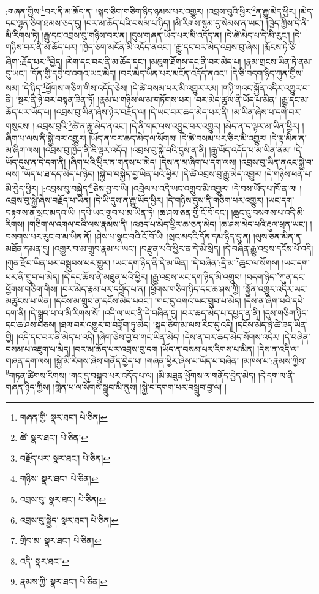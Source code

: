 :གཞན་གྱིས་\footnote{གཞན་གྱི་  སྣར་ཐང་།  པེ་ཅིན། }བར་ནི་མ་ཆོད་ན། །སྐད་ཅིག་གཅིག་ཉིད་ཉམས་པར་འགྱུར། །འབྲས་བུའི་ཕྱིར་\footnote{ཚེ་  སྣར་ཐང་།  པེ་ཅིན། }ན་རྒྱུ་མེད་ཕྱིར། །མེད་དང་ལྷན་ཅིག་ཐམས་ཅད་དུ། །བར་མ་ཆོད་པའི་བསམ་པ་ཉིད། །མི་རིགས་སྙམ་དུ་སེམས་ན་ཡང་། །ཁྱེད་ཀྱིས་དེ་ནི་མི་རིགས་ཏེ། །རྒྱུ་དང་འབྲས་བུ་གཉིས་བར་ན། །དུས་གཞན་ཡོད་པར་མི་འདོད་ན། །དེ་ཚེ་མེད་པ་དེ་མི་རུང་། །དེ་གཉིས་བར་ནི་མ་ཆོད་པར། །ཁྱེད་ཅག་མངོན་མི་འདོད་ནའང་། །རྒྱུ་དང་བར་མེད་འབྲས་བུ་ཞེས། །རྨོངས་ཏེ་ཅི་ཞིག་:རྗོད་པར་\footnote{བརྗོད་པར་  སྣར་ཐང་།  པེ་ཅིན། }བྱེད། །རེག་དང་བར་ནི་མ་ཆོད་དང་། །མཇུག་ཐོགས་དང་ནི་བར་མེད་པ། །རྣམ་གྲངས་ཡིན་ཏེ་ནམ་དུ་ཡང་། །དོན་གྱི་དབྱེ་བ་འགའ་ཡང་མེད། །བར་མེད་ཡིན་པར་མངོན་འདོད་ནའང་། །དེ་ཅི་བདག་ཉིད་ཀུན་གྱིས་སམ། །དེ་ཉིད་\footnote{གཉིས་  སྣར་ཐང་།  པེ་ཅིན། }ཕྱོགས་གཅིག་གིས་འདོད་ཅེས། །དེ་ཚེ་བསམ་པར་མི་འགྱུར་རམ། །གཉི་གའང་སྐྱོན་འདིར་འགྱུར་བ་ནི། །སྔར་ནི་ཉེ་བར་བསྟན་ཟིན་ཏོ། །རྣམ་པ་གཉིས་ལ་མ་གཏོགས་པར། །བར་མེད་ཚུལ་ནི་ཡོད་པ་མིན། །རྒྱུ་དང་མ་ཆོད་པར་ཡོད་པ། །འབྲས་བུ་ཡིན་ཞེས་ཉེར་བརྗོད་ལ། །དེ་ཡང་བར་ཆད་མེད་པར་ནི། །མ་ཡིན་ཞེས་པ་དགེ་བར་གསུངས། །:འབྲས་བུའི་\footnote{འབྲས་བུ་  སྣར་ཐང་།  པེ་ཅིན། }ཚེ་ན་རྒྱུ་མེད་ནའང་། །དེ་ནི་གང་ལས་འབྱུང་བར་འགྱུར། །མེད་ན་ད་ལྟར་མ་ཡིན་ཕྱིར། །ཞིག་པ་ལས་ནི་སྐྱེ་བར་འགྱུར། །ཡོད་ན་བར་ཆད་མེད་ལ་སོགས། །དེ་ཚེ་བསམ་པར་ཅིར་མི་འགྱུར། །དེ་ལྟ་མིན་ན་མ་ཞིག་ལས། །འབྲས་བུ་ཁྱེད་ནི་ཇི་ལྟར་འདོད། །འབྲས་བུ་སྐྱེ་བའི་དུས་ན་ནི། །རྒྱུ་ཡོད་འདོད་པ་མ་ཡིན་ནམ། །དེ་ཡོད་དུས་ན་དེ་དག་ནི། །ཞིག་པའི་ཕྱིར་ན་གནས་པ་མེད། །དེས་ན་མ་ཞིག་པ་དག་ལས། །འབྲས་བུ་ཡིན་ནའང་སྐྱེ་བ་ལས། །ཡོད་པ་ཐ་དད་མེད་པ་ཉིད། །སྐྱེ་བ་བསྐྱེད་བྱ་ཡིན་པའི་ཕྱིར། །དེ་ཚེ་འབྲས་བུ་རྒྱུ་མེད་འགྱུར། །དེ་གཉིས་ཕན་པ་མི་བྱེད་ཕྱིར། །:འབྲས་བུ་བསྐྱེད་\footnote{འབྲས་བུ་སྐྱེད་  སྣར་ཐང་།  པེ་ཅིན། }ཅེས་བྱ་བ་ཡི། །འབྲེལ་པ་འདི་ཡང་འགྲུབ་མི་འགྱུར། །དེ་བས་ཡོད་པ་ཁོ་ན་ལ། །
འབྲས་བུ་སྐྱེ་ཞེས་བརྗོད་པ་ཡིན། །དེ་ཡི་དུས་ན་རྒྱུ་ཡོད་ཕྱིར། །དེ་གཉིས་དུས་ནི་གཅིག་པར་འགྱུར། །ཡང་དག་བརྟགས་ན་སྲང་མདའ་ཡི། །དཔེ་ཡང་གྲུབ་པ་མ་ཡིན་ཏེ། །ཆ་ཤས་ཅན་གྱི་ངོ་བོ་དང་། །ཆུང་ངུ་བསགས་པ་འདི་མི་རིགས། །གཅིག་ལ་འགལ་བའི་ལས་རྣམས་ནི། །འཐད་པ་མེད་ཕྱིར་ཆ་ཅན་མེད། །ཆ་ཤས་མེད་པའི་རྡུལ་ཕྲན་ཡང་། །བསགས་པར་རུང་བ་མ་ཡིན་ནོ། །ཤེས་པ་སྣང་བའི་ངོ་བོ་ཡི། །སྲང་མདའི་དོན་དམ་ཉིད་དུ་ན། །ལུས་ཅན་མིན་ན་མཐོན་དམན་དུ། །འགྱུར་བ་མ་གྲུབ་རྣམ་པ་ཡང་། །བརྫུན་པའི་ཕྱིར་ན་དེ་མི་སྲིད། །དེ་བཞིན་རྒྱུ་འབྲས་དངོས་པོ་འདི། །ཀུན་རྫོབ་ཡིན་པར་བསྒྲུབས་པར་གྱུར། །ཡང་དག་ཉིད་ནི་དེ་མ་ཡིན། །དེ་བཞིན་:དྲི་མ་\footnote{གྲིབ་མ་  སྣར་ཐང་།  པེ་ཅིན། }ཆུང་ལ་སོགས། །ཡང་དག་པར་ནི་གྲུབ་པ་མེད། །དེ་དང་ཆོས་ནི་མཐུན་པའི་ཕྱིར། །རྒྱུ་འབྲས་ཡང་དག་ཉིད་མི་འགྲུབ། །བདག་ཉིད་\footnote{འདི་  སྣར་ཐང་། }ཀུན་དང་ཕྱོགས་གཅིག་གིས། །བར་མེད་རྣམ་པར་དཔྱོད་པ་ན། །ཕྱོགས་གཅིག་ཉིད་དང་ཆ་ཤས་ཀྱི། །སྐྱོན་འགྱུར་འདིར་ཡང་མཚུངས་པ་ཡིན། །དངོས་མ་གྲུབ་ན་དངོས་མེད་པའང་། །གང་དུ་འགའ་ཡང་གྲུབ་པ་མེད། །དེས་ན་ཞིག་པའི་དཔེ་དག་ནི། །དེ་སྒྲུབ་པ་ལ་མི་རིགས་སོ། །འདི་ལ་ཡང་ནི་དེ་བཞིན་དུ། །བར་ཆད་མེད་པ་དཔྱད་ན་ནི། །དུས་གཅིག་ཉིད་དང་ཆ་ཤས་བཅས། །ཐལ་བར་འགྱུར་བ་བཟློག་ཏུ་མེད། །སྐད་ཅིག་མ་ལས་རིང་དུ་འདི། །དངོས་མེད་ཉི་ཚེ་ཟད་ཡིན་གྱི། །འདི་དང་བར་ནི་མེད་པ་འདི། །ཞིག་ཅེས་བྱ་བ་གང་ཡིན་མེད། །དེས་ན་བར་ཆད་མེད་སོགས་འདིར། །དེ་བཞིན་བསམ་པ་འཇུག་པ་མེད། །བར་མ་ཆོད་པར་འབྲས་བུ་དག །ཡོད་ན་བསམ་པར་རིགས་པ་མིན། །དེས་ན་འདི་ལ་གཞན་དག་ལས། །སྐྱེ་མི་རིགས་ཞེས་གནོད་བྱེད་པ། །གཞན་ཕྱིར་ཞེས་པ་ཡོད་པ་བཞིན། །མཁས་པ་:རྣམས་ཀྱིས་\footnote{རྣམས་ཀྱི་  སྣར་ཐང་།  པེ་ཅིན། }གཏན་ཚིགས་རིགས། །གང་དུ་བསྒྲུབ་པར་འདོད་པ་ལ། །མི་མཐུན་ཕྱོགས་ལ་གནོད་བྱེད་མེད། །དེ་དག་ལ་ནི་གཞན་ཉིད་ཀྱིས། །གླེན་པ་ལ་སོགས་སྒྲུབ་མི་ནུས། །སྐྱེ་བ་དགག་པར་བསྒྲུབ་བྱ་ལ། །

